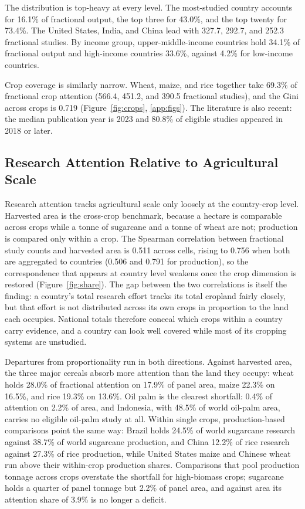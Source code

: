 \documentclass[ASNA,twocolumn]{USG}
\begin{document}
The distribution is top-heavy at every level. The most-studied country accounts for 16.1\% of
fractional output, the top three for 43.0\%, and the top twenty for 73.4\%. The United States, India, and China lead with 327.7, 292.7, and 252.3 fractional
studies. By income group, upper-middle-income countries hold 34.1\% of fractional output and
high-income countries 33.6\%, against 4.2\% for low-income countries.

Crop coverage is similarly narrow. Wheat, maize, and rice together take 69.3\% of fractional crop attention (566.4, 451.2, and
390.5 fractional studies), and the Gini across crops is 0.719 (Figure~\ref{fig:crops}, \ref{app:figs}). The literature is also recent: the median
publication year is 2023 and 80.8\% of eligible studies appeared in 2018 or later.

\subsection{Research Attention Relative to Agricultural Scale}

Research attention tracks agricultural scale only loosely at the country-crop level.
Harvested area is the cross-crop benchmark, because a hectare is comparable across crops
while a tonne of sugarcane and a tonne of wheat are not; production is compared only within
a crop. The Spearman correlation between fractional study counts and harvested area is 0.511 across cells,
rising to 0.756 when both are aggregated to countries (0.506 and 0.791 for production), so the
correspondence that appears at country level weakens once the crop dimension is restored
(Figure~\ref{fig:share}). The gap between the two correlations is itself the finding: a country's
total research effort tracks its total cropland fairly closely, but that effort is not distributed
across its own crops in proportion to the land each occupies. National totals therefore conceal
which crops within a country carry evidence, and a country can look well covered while most of its
cropping systems are unstudied.

Departures from proportionality run in both directions. Against harvested area, the three
major cereals absorb more attention than the land they occupy: wheat holds 28.0\% of
fractional attention on 17.9\% of panel area, maize 22.3\% on 16.5\%, and rice 19.3\% on
13.6\%. Oil palm is the clearest shortfall: 0.4\% of attention on 2.2\% of area, and
Indonesia, with 48.5\% of world oil-palm area, carries no eligible oil-palm study at all.
Within single crops, production-based comparisons point the same way: Brazil holds 24.5\%
of world sugarcane research against 38.7\% of world sugarcane production, and China 12.2\%
of rice research against 27.3\% of rice production, while United States maize and Chinese
wheat run above their within-crop production shares. Comparisons that pool production
tonnage across crops overstate the shortfall for high-biomass crops; sugarcane holds a
quarter of panel tonnage but 2.2\% of panel area, and against area its attention share of
3.9\% is no longer a deficit.
\end{document}
